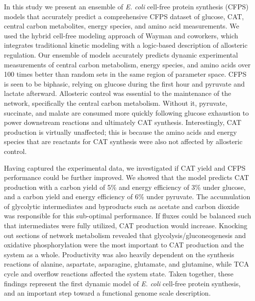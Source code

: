 \documentclass[12pt]{article}
\begin{document}
In this study we present an ensemble of \textit{E. coli} cell-free protein synthesis (CFPS) models that accurately predict a comprehensive CFPS dataset of glucose, CAT, central carbon metabolites, energy species, and amino acid measurements.
We used the hybrid cell-free modeling approach of Wayman and coworkers, which integrates traditional kinetic modeling with a logic-based description of allosteric regulation.
Our ensemble of models accurately predicts dynamic experimental measurements of central carbon metabolism, energy species, and amino acids over 100 times better than random sets in the same region of parameter space.
CFPS is seen to be biphasic, relying on glucose during the first hour and pyruvate and lactate afterward.
Allosteric control was essential to the maintenance of the network, specifically the central carbon metabolism.
Without it, pyruvate, succinate, and malate are consumed more quickly following glucose exhaustion to power downstream reactions and ultimately CAT synthesis.
Interestingly, CAT production is virtually unaffected; this is because the amino acids and energy species that are reactants for CAT synthesis were also not affected by allosteric control.

Having captured the experimental data, we investigated if CAT yield and CFPS performance could be further improved.
We showed that the model predicts CAT production with a carbon yield of 5\% and energy efficiency of 3\% under glucose, and a carbon yield and energy efficiency of 6\% under pyruvate.
The accumulation of glycolytic intermediates and byproducts such as acetate and carbon dioxide was responsible for this sub-optimal performance.
If fluxes could be balanced such that intermediates were fully utilized, CAT production would increase.
Knocking out sections of network metabolism revealed that glycolysis\slash gluconeogenesis and oxidative phosphorylation were the most important to CAT production and the system as a whole.
Productivity was also heavily dependent on the synthesis reactions of alanine, aspartate, asparagine, glutamate, and glutamine, while TCA cycle and overflow reactions affected the system state.
Taken together, these findings represent the first dynamic model of \textit{E. coli} cell-free protein synthesis, and an important step toward a functional genome scale description.
\end{document}
